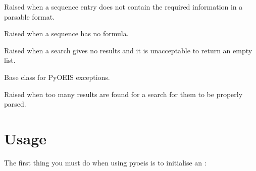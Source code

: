 \documentclass[letterpaper,10pt,english]{sphinxmanual}
\begin{document}
\begin{fulllineitems}
\label{api:errors.MalformedSequenceError}
Raised when a sequence entry does not contain the required
information in a parsable format.

\end{fulllineitems}


\begin{fulllineitems}
\label{api:errors.NoFunctionError}
Raised when a sequence has no formula.

\end{fulllineitems}


\begin{fulllineitems}
\label{api:errors.NoResultsError}
Raised when a search gives no results and it is unacceptable to
return an empty list.

\end{fulllineitems}


\begin{fulllineitems}
\label{api:errors.OEISException}
Base class for PyOEIS exceptions.

\end{fulllineitems}


\begin{fulllineitems}
\label{api:errors.TooManyResultsError}
Raised when too many results are found for a search for them to
be properly parsed.

\end{fulllineitems}



\chapter{Usage}
\label{usage:usage}\label{usage::doc}
The first thing you must do when using pyoeis is to initialise an
{\hyperref[api:client.OEISClient]{\emph{}}}:
\end{document}
